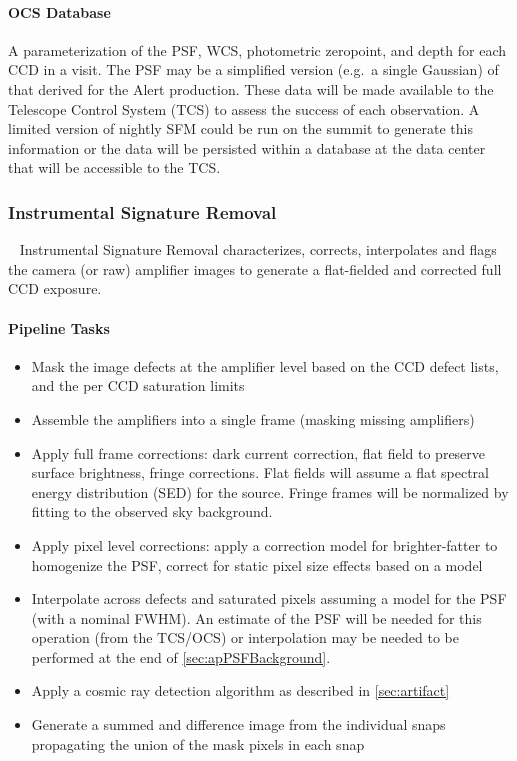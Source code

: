 \paragraph*{OCS Database} A parameterization of the PSF, WCS, photometric zeropoint, and depth for each CCD in a visit. The PSF may be a simplified version (e.g.\ a single Gaussian) of that derived for the Alert production. These data will be made available to the Telescope Control System (TCS) to assess the success of each observation. A limited version of nightly SFM could be run on the summit to generate this information or the  data will be persisted within a database at the data center that will be accessible to the TCS.


\subsubsection{Instrumental Signature Removal}~
\label{sec:apISR}
Instrumental Signature Removal characterizes, corrects, interpolates and flags the camera (or raw) amplifier images to generate a flat-fielded and corrected full CCD exposure.

\paragraph{Pipeline Tasks}
\begin{itemize}
\item Mask the image defects at the amplifier level based on the CCD defect lists, and the per CCD saturation limits
\item Assemble the amplifiers into a single frame (masking missing amplifiers)
\item Apply full frame corrections: dark current correction, flat field to preserve surface brightness, fringe corrections. Flat fields will assume a flat spectral energy distribution (SED) for the source. Fringe frames will be normalized by fitting to the observed sky background.
\item Apply pixel level corrections: apply a correction model for brighter-fatter to homogenize the PSF, correct for static pixel size effects based on a model
\item Interpolate across defects and saturated pixels assuming a model for the PSF (with a nominal FWHM). An estimate of the PSF will be needed for this operation (from the TCS/OCS) or interpolation may be needed to be performed at the end of \ref{sec:apPSFBackground}.
\item Apply a cosmic ray detection algorithm as described in \ref{sec:artifact}
\item Generate a summed and difference image from the individual snaps propagating the union of the mask pixels in each snap
\end{itemize}

